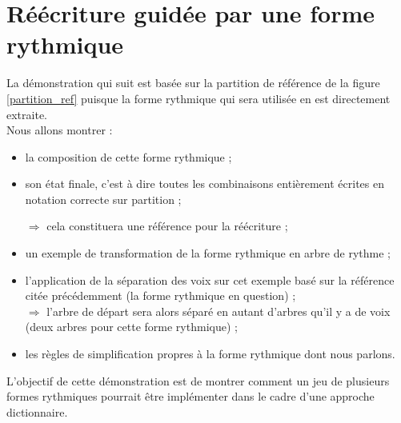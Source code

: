 \section{Réécriture guidée par une forme rythmique}
\label{reecriture_guidee}
La démonstration qui suit est basée sur la partition de référence de la figure
\ref{partition_ref} puisque la forme rythmique qui sera utilisée en est
directement extraite.\\

Nous allons montrer :
\begin{itemize}
    \item la composition de cette forme rythmique ;
    \item son état finale, c’est à dire toutes les combinaisons entièrement
        écrites en notation correcte sur partition ;

        $\Rightarrow$ cela constituera une référence pour la réécriture ;
    \item un exemple de transformation de la forme rythmique en arbre de
        rythme ;
    \item l’application de la séparation des voix sur cet exemple basé sur la
        référence citée précédemment (la forme rythmique en question) ;\\
        $\Rightarrow$ l’arbre de départ sera alors séparé en autant d’arbres
        qu’il y a de voix (deux arbres pour cette forme rythmique) ;
    \item les règles de simplification propres à la forme rythmique dont nous
        parlons. 
\end{itemize}
L’objectif de cette démonstration est de montrer comment un jeu de plusieurs
formes rythmiques pourrait être implémenter dans le cadre d’une approche
dictionnaire.

